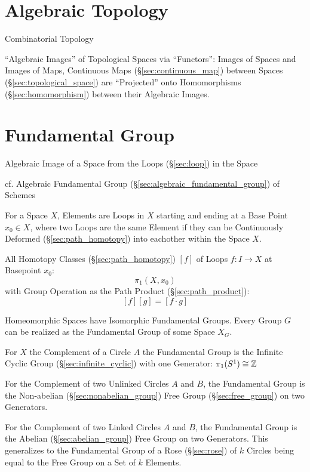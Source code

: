\section{Algebraic Topology}\label{sec:algebraic_topology}

Combinatorial Topology

``Algebraic Images'' of Topological Spaces via ``Functors'': Images of
Spaces and Images of Maps, Continuous Maps
(\S\ref{sec:continuous_map}) between Spaces
(\S\ref{sec:topological_space}) are ``Projected'' onto Homomorphisms
(\S\ref{sec:homomorphism}) between their Algebraic
Images.\cite{hatcher02}



\section{Fundamental Group}\label{sec:fundamental_group}

Algebraic Image of a Space from the Loops (\S\ref{sec:loop}) in the
Space

cf. Algebraic Fundamental Group (\S\ref{sec:algebraic_fundamental_group}) of
Schemes

For a Space $X$, Elements are Loops in $X$ starting and ending at a
Base Point $x_0 \in X$, where two Loops are the same Element if they
can be Continuously Deformed (\S\ref{sec:path_homotopy}) into
eachother within the Space $X$.

All Homotopy Classes (\S\ref{sec:path_homotopy}) $[f]$ of Loops $f : I
\rightarrow X$ at Basepoint $x_0$:
\[
  \pi_1(X,x_0)
\]
with Group Operation as the Path Product (\S\ref{sec:path_product}):
\[
  [f][g] = [f \cdot g]
\]

Homeomorphic Spaces have Isomorphic Fundamental Groups. Every Group
$G$ can be realized as the Fundamental Group of some Space $X_G$.
\cite{hatcher02}

For $X$ the Complement of a Circle $A$ the Fundamental Group is the
Infinite Cyclic Group (\S\ref{sec:infinite_cyclic}) with one
Generator: $\pi_1(S^1) \cong \mathbb{Z}$

For the Complement of two Unlinked Circles $A$ and $B$, the
Fundamental Group is the Non-abelian (\S\ref{sec:nonabelian_group})
Free Group (\S\ref{sec:free_group}) on two Generators.

For the Complement of two Linked Circles $A$ and $B$, the Fundamental
Group is the Abelian (\S\ref{sec:abelian_group}) Free Group on two
Generators. \cite{hatcher02} This generalizes to the Fundamental Group
of a Rose (\S\ref{sec:rose}) of $k$ Circles being equal to the Free
Group on a Set of $k$ Elements.

